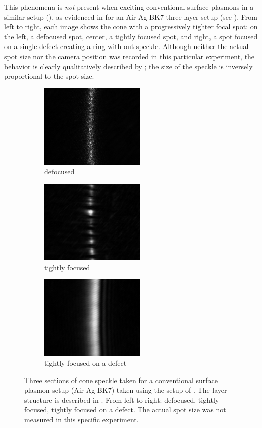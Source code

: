 This phenomena is \textit{not} present when exciting conventional surface
plasmons in a similar setup (), as evidenced in
 for an Air-Ag-BK7 three-layer setup (see
).  From left to right, each image shows the cone
with a progressively tighter focal spot: on the left, a defocused spot,
center, a tightly focused spot, and right, a spot focused on a single defect
creating a ring with out speckle.  Although neither the actual spot size nor
the camera position was recorded in this particular experiment, the behavior
is clearly qualitatively described by ; the size of
the speckle is inversely proportional to the spot size.
\begin{figure}[ht]
\centering
\begin{subfigure}[b]{5cm}
\includegraphics[keepaspectratio,width=5cm]{speckle/figures/Ag_BK7_cone_lens00_ccd-10.jpg}
\caption{defocused}
\end{subfigure}
\begin{subfigure}[b]{5cm}
\includegraphics[keepaspectratio,width=5cm]{speckle/figures/Ag_BK7_cone_lens10_ccd-5.jpg}
\caption{tightly focused}
\end{subfigure}
\begin{subfigure}[b]{5cm}
\includegraphics[keepaspectratio,width=5cm]{speckle/figures/Ag_LaSFN9_cone_lens10_ccd-153.jpg}
\caption{tightly focused on a defect}
\end{subfigure}
\caption{Three sections of cone speckle taken for a conventional surface
				plasmon setup (Air-Ag-BK7) taken using the setup of
				.  The layer structure is described in
				.  From left to right: defocused, tightly
focused, tightly focused on a defect.  The actual spot size was not measured
in this specific experiment.  }
\label{fig:threespecklesizes}
\end{figure}


